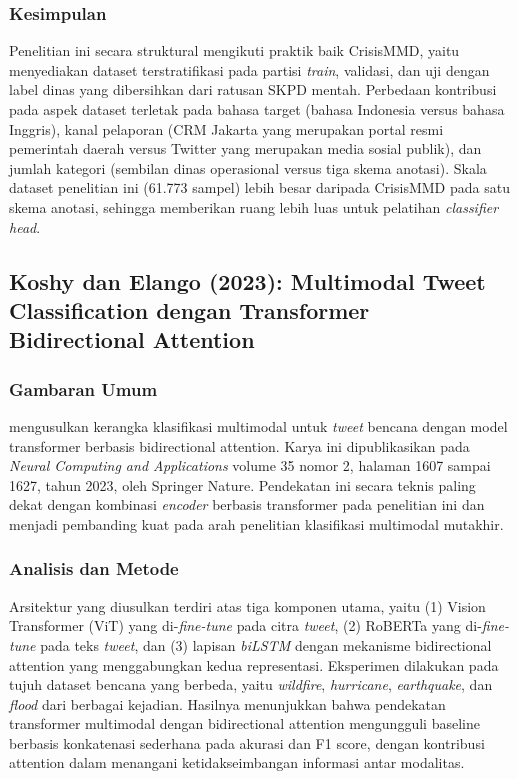 \subsubsection{Kesimpulan}

Penelitian ini secara struktural mengikuti praktik baik CrisisMMD, yaitu menyediakan dataset terstratifikasi pada partisi \textit{train}, validasi, dan uji dengan label dinas yang dibersihkan dari ratusan SKPD mentah. Perbedaan kontribusi pada aspek dataset terletak pada bahasa target (bahasa Indonesia versus bahasa Inggris), kanal pelaporan (CRM Jakarta yang merupakan portal resmi pemerintah daerah versus Twitter yang merupakan media sosial publik), dan jumlah kategori (sembilan dinas operasional versus tiga skema anotasi). Skala dataset penelitian ini (61.773 sampel) lebih besar daripada CrisisMMD pada satu skema anotasi, sehingga memberikan ruang lebih luas untuk pelatihan \textit{classifier head}.

\subsection{Koshy dan Elango (2023): Multimodal Tweet Classification dengan Transformer Bidirectional Attention}

\subsubsection{Gambaran Umum}

\citet{koshyMultimodalTweet2023} mengusulkan kerangka klasifikasi multimodal untuk \textit{tweet} bencana dengan model transformer berbasis bidirectional attention. Karya ini dipublikasikan pada \textit{Neural Computing and Applications} volume 35 nomor 2, halaman 1607 sampai 1627, tahun 2023, oleh Springer Nature. Pendekatan ini secara teknis paling dekat dengan kombinasi \textit{encoder} berbasis transformer pada penelitian ini dan menjadi pembanding kuat pada arah penelitian klasifikasi multimodal mutakhir.

\subsubsection{Analisis dan Metode}

Arsitektur yang diusulkan terdiri atas tiga komponen utama, yaitu (1) Vision Transformer (ViT) yang di-\textit{fine-tune} pada citra \textit{tweet}, (2) RoBERTa yang di-\textit{fine-tune} pada teks \textit{tweet}, dan (3) lapisan \textit{biLSTM} dengan mekanisme bidirectional attention yang menggabungkan kedua representasi. Eksperimen dilakukan pada tujuh dataset bencana yang berbeda, yaitu \textit{wildfire}, \textit{hurricane}, \textit{earthquake}, dan \textit{flood} dari berbagai kejadian. Hasilnya menunjukkan bahwa pendekatan transformer multimodal dengan bidirectional attention mengungguli baseline berbasis konkatenasi sederhana pada akurasi dan F1 score, dengan kontribusi attention dalam menangani ketidakseimbangan informasi antar modalitas.

